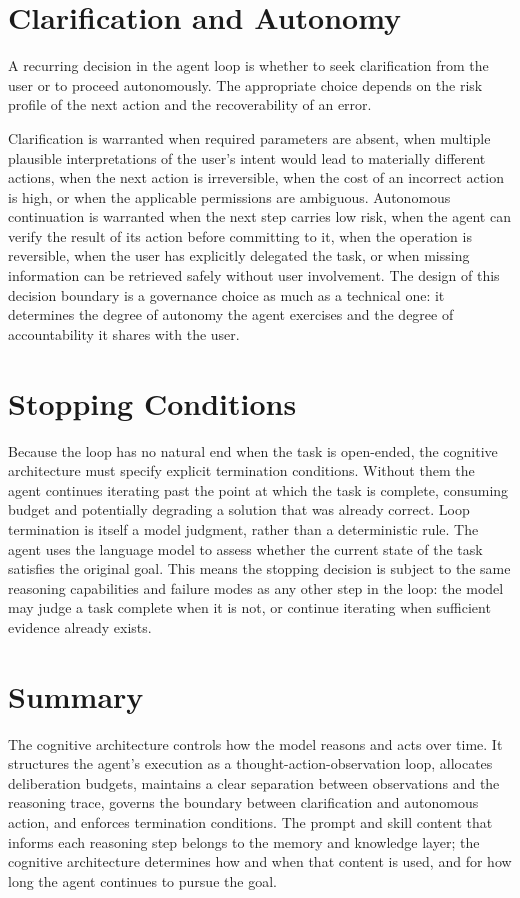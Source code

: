 \section{Clarification and Autonomy}

A recurring decision in the agent loop is whether to seek clarification from the user
or to proceed autonomously. The appropriate choice depends on the risk profile of the
next action and the recoverability of an error.

Clarification is warranted when required parameters are absent, when multiple plausible
interpretations of the user's intent would lead to materially different actions, when
the next action is irreversible, when the cost of an incorrect action is high, or when
the applicable permissions are ambiguous. Autonomous continuation is warranted when the
next step carries low risk, when the agent can verify the result of its action before
committing to it, when the operation is reversible, when the user has explicitly
delegated the task, or when missing information can be retrieved safely without user
involvement. The design of this decision boundary is a governance choice as much as a
technical one: it determines the degree of autonomy the agent exercises and the degree
of accountability it shares with the user.

\section{Stopping Conditions}

Because the loop has no natural end when the task is open-ended, the cognitive
architecture must specify explicit termination conditions. Without them the agent
continues iterating past the point at which the task is complete, consuming budget and
potentially degrading a solution that was already correct.
Loop termination is itself a model judgment, rather than a deterministic rule. The agent uses
the language model to assess whether the current state of the task satisfies the original
goal. This means the stopping decision is subject to the same reasoning capabilities and
failure modes as any other step in the loop: the model may judge a task complete when it
is not, or continue iterating when sufficient evidence already exists.

\section{Summary}

The cognitive architecture controls how the model reasons and acts over time. It
structures the agent's execution as a thought-action-observation loop, allocates
deliberation budgets, maintains a clear separation between observations and the
reasoning trace, governs the boundary between clarification and autonomous action, and
enforces termination conditions. The prompt and skill content that informs each reasoning
step belongs to the memory and knowledge layer; the cognitive architecture determines
how and when that content is used, and for how long the agent continues to pursue the
goal.
